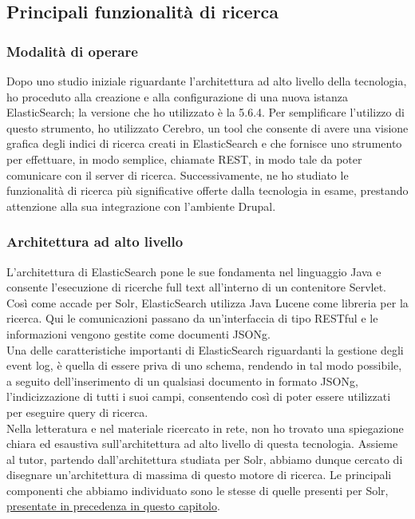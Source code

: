 		\subsection{Principali funzionalità di ricerca}
		
			\subsubsection{Modalità di operare}
			Dopo uno studio iniziale riguardante l'architettura ad alto livello della tecnologia, ho proceduto alla creazione e alla configurazione di una nuova istanza \gls{ElasticSearch}; la versione che ho utilizzato è la 5.6.4. Per semplificare l'utilizzo di questo strumento, ho utilizzato \gls{Cerebro}, un tool che consente di avere una visione grafica degli indici di ricerca creati in \gls{ElasticSearch} e che fornisce uno strumento per effettuare, in modo semplice, chiamate \gls{REST}, in modo tale da poter comunicare con il server di ricerca.
			Successivamente, ne ho studiato le funzionalità di ricerca più significative offerte dalla tecnologia in esame, prestando attenzione alla sua integrazione con l'ambiente \gls{Drupal}.
			
			\subsubsection{Architettura ad alto livello}
			L'architettura di \gls{ElasticSearch} pone le sue fondamenta nel linguaggio \gls{Java} e consente l'esecuzione di ricerche full text all'interno di un contenitore \gls{Servlet}. Così come accade per \gls{Solr}, \gls{ElasticSearch} utilizza \gls{Java Lucene} come libreria per la ricerca. Qui le comunicazioni passano da un'interfaccia di tipo \gls{RESTful} e le informazioni vengono gestite come documenti \gls{JSONg}.\\
			Una delle caratteristiche importanti di \gls{ElasticSearch} riguardanti la gestione degli event log, è quella di essere priva di uno schema, rendendo in tal modo possibile, a seguito dell'inserimento di un qualsiasi documento in formato \gls{JSONg}, l'indicizzazione di tutti i suoi campi, consentendo così di poter essere utilizzati per eseguire query di ricerca. \\
			Nella letteratura e nel materiale ricercato in rete, non ho trovato una spiegazione chiara ed esaustiva sull'architettura ad alto livello di questa tecnologia. Assieme al tutor, partendo dall'architettura studiata per \gls{Solr}, abbiamo dunque cercato di disegnare un'architettura di massima di questo motore di ricerca. Le principali componenti che abbiamo individuato sono le stesse di quelle presenti per \gls{Solr}, \hyperref[solr:architettura_ad_alto_livello]{presentate in precedenza in questo capitolo}.

